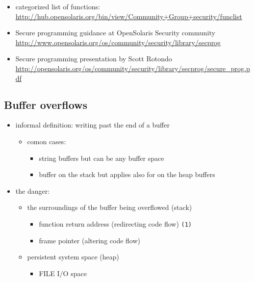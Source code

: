 \begin{itemize}
  \item categorized list of functions:
    \url{http://hub.opensolaris.org/bin/view/Community+Group+security/funclist}
  \item Secure programming guidance at OpenSolaris Security community
    \url{http://www.opensolaris.org/os/community/security/library/secprog}
  \item Secure programming presentation by Scott Rotondo
    \url{http://opensolaris.org/os/community/security/library/secprog/secure\_prog.pdf}
\end{itemize}


\subsection{Buffer overflows}

\begin{itemize}
  \item informal definition: writing past the end of a buffer
  \begin{itemize}
    \item comon cases:
    \begin{itemize}
      \item string buffers but can be any buffer space
      \item buffer on the stack but applies also for on the heap buffers
    \end{itemize}
  \end{itemize}
  \item the danger:
  \begin{itemize}
    \item the surroundings of the buffer being overflowed (stack)
    \begin{itemize}
      \item function return address (redirecting code flow) \texttt{(1)}
      \item frame pointer (altering code flow)
    \end{itemize}
  \item persistent system space (heap)
    \begin{itemize}
      \item FILE I/O space
    \end{itemize}
  \end{itemize}
\end{itemize}



